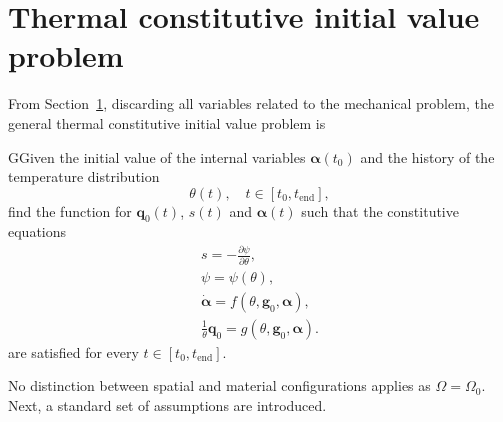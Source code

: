 \section{Thermal constitutive initial value problem}

From Section~\ref{}, discarding all variables related to the mechanical problem, the general thermal constitutive initial value problem is
\begin{problem}
GGiven the initial value of the internal variables \(\bm \alpha(t_0)\) and the history of the temperature distribution
\[\theta(t),\quad t\in[t_0, t_\text{end}],\]
find the function for $\bm q_0(t)$, \(s(t)\) and \(\bm \alpha(t)\) such that the constitutive equations
\begin{gather}
    s = -\frac{\partial \psi}{\partial \theta},\label{eq:entropy_constitutive_relation}\\
    \psi = \psi(\theta),\\
    \dot{\bm \alpha} = f(\theta, \bm g_0, \bm \alpha),\\
    \frac{1}{\theta}\bm q_0 = g(\theta, \bm g_0, \bm \alpha).
\end{gather}
are satisfied for every $t\in [t_0, t_\text{end}]$.
\end{problem}
No distinction between spatial and material configurations applies as \(\Omega = \Omega_0\).
Next, a standard set of assumptions are introduced.

